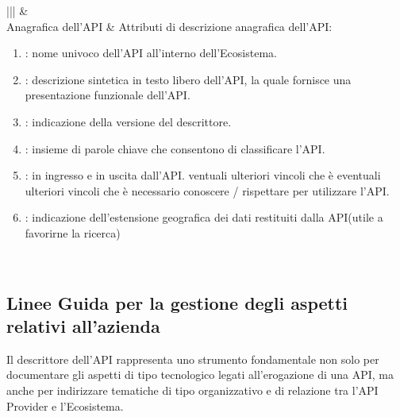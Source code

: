 \documentclass[letterpaper,10pt,italian]{sphinxmanual}
\begin{document}
\begin{savenotes}\sphinxattablestart
\centering
{}
\label{\detokenize{sez26:id1}}
\sphinxaftercaption
\begin{tabular}[t]{|*{2}{|}}
\hline
{}\relax &\relax \\
\hline
Anagrafica dell’API
&
Attributi di descrizione anagrafica dell’API:
\begin{enumerate}
\item {} 
: nome univoco dell’API all’interno dell’Ecosistema.

\item {} 
: descrizione sintetica in testo libero dell’API, la quale fornisce una presentazione funzionale dell’API.

\item {} 
: indicazione della versione del descrittore.

\item {} 
: insieme di parole chiave che consentono di classificare l’API.

\item {} 
: in ingresso e in uscita dall’API. ventuali ulteriori vincoli che è eventuali ulteriori vincoli che è necessario conoscere / rispettare per utilizzare l’API.

\item {} 
: indicazione dell’estensione geografica dei dati restituiti dalla API(utile a favorirne la ricerca)

\end{enumerate}
\\
\hline
\end{tabular}
\par
\sphinxattableend\end{savenotes}


\subsection{Linee Guida per la gestione degli aspetti relativi all’azienda}
\label{\detokenize{sez26:linee-guida-per-la-gestione-degli-aspetti-relativi-allazienda}}\label{\detokenize{sez26:sezione262}}
Il descrittore dell’API rappresenta uno strumento fondamentale non solo per documentare gli aspetti di tipo tecnologico legati all’erogazione di una API, ma anche per indirizzare tematiche di tipo organizzativo e di relazione tra l’API Provider e l’Ecosistema.
\end{document}
